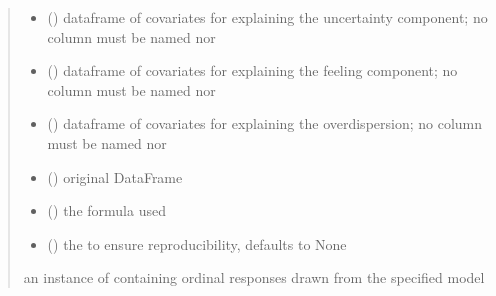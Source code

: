 \documentclass[letterpaper,10pt,english]{sphinxmanual}
\begin{document}
\begin{fulllineitems}
\begin{quote}
\begin{description}
\begin{itemize}
\item {} 
\sphinxAtStartPar
{} () \textendash{} dataframe of covariates for explaining the uncertainty component;
no column must be named  nor 

\item {} 
\sphinxAtStartPar
{} () \textendash{} dataframe of covariates for explaining the feeling component;
no column must be named  nor 

\item {} 
\sphinxAtStartPar
{} () \textendash{} dataframe of covariates for explaining the overdispersion;
no column must be named  nor 

\item {} 
\sphinxAtStartPar
{} () \textendash{} original DataFrame

\item {} 
\sphinxAtStartPar
{} () \textendash{} the formula used

\item {} 
\sphinxAtStartPar
{} (\sphinxstyleliteralemphasis{\sphinxupquote{, }}) \textendash{} the  to ensure reproducibility, defaults to None

\end{itemize}

\sphinxAtStartPar
an instance of  containing ordinal responses drawn from the specified model

\end{description}\end{quote}

\end{fulllineitems}

\end{document}
